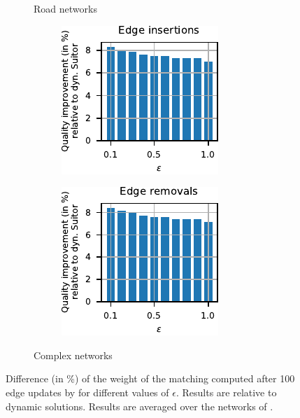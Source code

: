 \begin{figure}[t]
\begin{subfigure}[b]{.5\textwidth}
\caption{Road networks}
\label{fig:dyn-mwm:rw-qual-road}
\end{subfigure}\hfill
\begin{subfigure}[b]{.5\textwidth}
\begin{subfigure}[b]{.5\textwidth}
\centering
\includegraphics[width=.9\textwidth]{sources/plots/dyn-mwm/rw-insertion-cplx-qual.pdf}
\end{subfigure}\hfill
\begin{subfigure}[b]{.5\textwidth}
\centering
\includegraphics[width=.9\textwidth]{sources/plots/dyn-mwm/rw-removal-cplx-qual.pdf}
\end{subfigure}
\caption{Complex networks}
\label{fig:dyn-mwm:rw-qual-cplx}
\end{subfigure}
\caption{Difference (in \%) of the weight of the matching computed after
100 edge updates by \dynmwmrandom for different values of $\epsilon$. Results
are relative to dynamic \suitor solutions. Results are averaged over the
networks of .}
\label{fig:dyn-mwm:rw-qual-real-world}
\end{figure}



